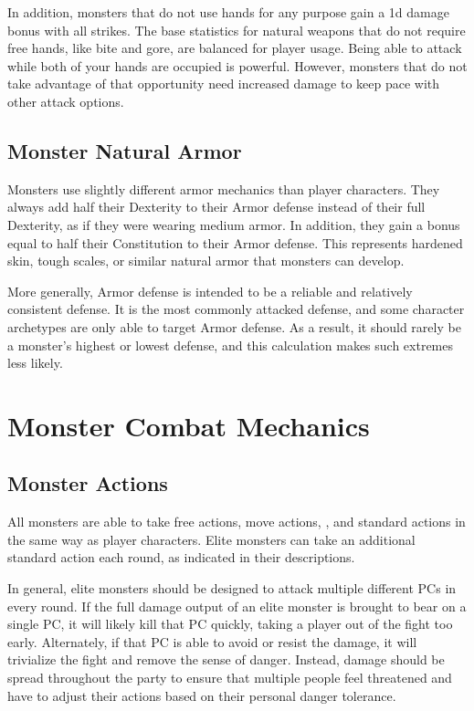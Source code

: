         In addition, monsters that do not use hands for any purpose gain a \plus1d damage bonus with all strikes.
        The base statistics for natural weapons that do not require free hands, like bite and gore, are balanced for player usage.
        Being able to attack while both of your hands are occupied is powerful.
        However, monsters that do not take advantage of that opportunity need increased damage to keep pace with other attack options.

    \subsection{Monster Natural Armor}\label{Monster Natural Armor}
        Monsters use slightly different armor mechanics than player characters.
        They always add half their Dexterity to their Armor defense instead of their full Dexterity, as if they were wearing medium armor.
        In addition, they gain a bonus equal to half their Constitution to their Armor defense.
        This represents hardened skin, tough scales, or similar natural armor that monsters can develop.

        More generally, Armor defense is intended to be a reliable and relatively consistent defense.
        It is the most commonly attacked defense, and some character archetypes are only able to target Armor defense.
        As a result, it should rarely be a monster's highest or lowest defense, and this calculation makes such extremes less likely.

\section{Monster Combat Mechanics}

    \subsection{Monster Actions}\label{Monster Actions}
        All monsters are able to take free actions, move actions, , and standard actions in the same way as player characters.
        Elite monsters can take an additional standard action each round, as indicated in their descriptions.

        In general, elite monsters should be designed to attack multiple different PCs in every round.
        If the full damage output of an elite monster is brought to bear on a single PC, it will likely kill that PC quickly, taking a player out of the fight too early.
        Alternately, if that PC is able to avoid or resist the damage, it will trivialize the fight and remove the sense of danger.
        Instead, damage should be spread throughout the party to ensure that multiple people feel threatened and have to adjust their actions based on their personal danger tolerance.

